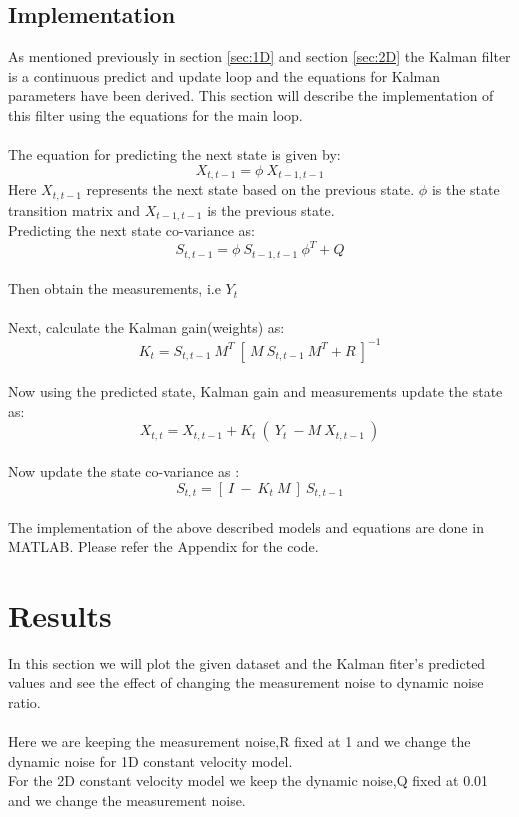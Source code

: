 \documentclass[12pt]{article}
\begin{document}
\subsection{Implementation}
\label{sec:implementation}
As mentioned previously in section \ref{sec:1D} and section \ref{sec:2D} the Kalman filter is a continuous predict and update loop and the equations for Kalman parameters have been derived. This section will describe the implementation of this filter using the equations for the main loop.\\
\\
The equation for predicting the next state is given by:
\begin{equation}
	X_{t,t-1} = \phi\  X_{t-1,t-1}
\label{eq:imp predict}
\end{equation}
Here $X_{t,t-1}$ represents the next state based on the previous state. $\phi$ is the state transition matrix and $X_{t-1,t-1}$ is the previous state.
\\
Predicting the next state co-variance as:
\begin{equation}
	S_{t,t-1} = \phi\  S_{t-1,t-1}\ \phi^T + Q
\label{eq:imp predict state co-var}
\end{equation}
\\
Then obtain the measurements, i.e $Y_t$ \\
\\
Next, calculate the Kalman gain(weights) as:
\begin{equation}
	K_t = S_{t,t-1}\ M^T\ [\ M\ S_{t,t-1}\ M^T + R\ ]^{-1}
\label{eq:imp kalman gain}
\end{equation}
\\
Now using the predicted state, Kalman gain and measurements update the state as:
\begin{equation}
	X_{t,t} = X_{t,t-1} + K_t\ (\ Y_t\ - M\ X_{t,t-1}\ )
\label{eq:imp state update}
\end{equation}
\\
Now update the state co-variance as :
\begin{equation}
	S_{t,t} = [\ I\ -\ K_t\ M\ ]\ S_{t,t-1}
\label{eq:imp state co-var update}
\end{equation}
\\
The implementation of the above described models and equations are done in MATLAB. Please refer the Appendix for the code.  


\section{Results}
In this section we will plot the given dataset and the Kalman fiter's predicted values and see the effect of changing the measurement noise to dynamic noise ratio.\\
\\
Here we are keeping the measurement noise,R fixed at 1 and we change the dynamic noise for 1D constant velocity model.  \\
For the 2D constant velocity model we keep the dynamic noise,Q fixed at 0.01 and we change the measurement noise. \\
\end{document}
